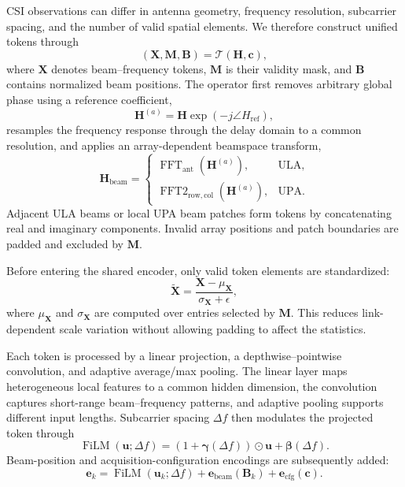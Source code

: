 CSI observations can differ in antenna geometry, frequency resolution, subcarrier spacing, and the
number of valid spatial elements. We therefore construct unified tokens through
\begin{equation}
(\mathbf X,\mathbf M,\mathbf B)=\mathcal T(\mathbf H,\mathbf c),
\label{eq:unified-tokenization}
\end{equation}
where $\mathbf X$ denotes beam--frequency tokens, $\mathbf M$ is their validity mask, and $\mathbf B$
contains normalized beam positions. The operator first removes arbitrary global phase using a reference
coefficient,
\begin{equation}
\mathbf H^{(a)}=\mathbf H\exp\!\left(-j\angle H_{\mathrm{ref}}\right),
\label{eq:phase-alignment}
\end{equation}
resamples the frequency response through the delay domain to a common resolution, and applies an
array-dependent beamspace transform,
\begin{equation}
\mathbf H_{\mathrm{beam}}=
\begin{cases}
\operatorname{FFT}_{\mathrm{ant}}(\mathbf H^{(a)}), & \text{ULA},\\
\operatorname{FFT2}_{\mathrm{row,col}}(\mathbf H^{(a)}), & \text{UPA}.
\end{cases}
\label{eq:beamspace-transform}
\end{equation}
Adjacent ULA beams or local UPA beam patches form tokens by concatenating real and imaginary
components. Invalid array positions and patch boundaries are padded and excluded by $\mathbf M$.

Before entering the shared encoder, only valid token elements are standardized:
\begin{equation}
\widetilde{\mathbf X}=
\frac{\mathbf X-\mu_{\mathbf X}}{\sigma_{\mathbf X}+\epsilon},
\label{eq:masked-standardization}
\end{equation}
where $\mu_{\mathbf X}$ and $\sigma_{\mathbf X}$ are computed over entries selected by $\mathbf M$.
This reduces link-dependent scale variation without allowing padding to affect the statistics.

Each token is processed by a linear projection, a depthwise--pointwise convolution, and adaptive
average/max pooling. The linear layer maps heterogeneous local features to a common hidden dimension,
the convolution captures short-range beam--frequency patterns, and adaptive pooling supports different
input lengths. Subcarrier spacing $\Delta f$ then modulates the projected token through
\begin{equation}
\operatorname{FiLM}(\mathbf u;\Delta f)=
\left(1+\boldsymbol\gamma(\Delta f)\right)\odot\mathbf u
+\boldsymbol\beta(\Delta f).
\label{eq:configuration-film}
\end{equation}
Beam-position and acquisition-configuration encodings are subsequently added:
\begin{equation}
\mathbf e_k=
\operatorname{FiLM}(\mathbf u_k;\Delta f)
+\mathbf e_{\mathrm{beam}}(\mathbf B_k)
+\mathbf e_{\mathrm{cfg}}(\mathbf c).
\label{eq:token-configuration-encoding}
\end{equation}

